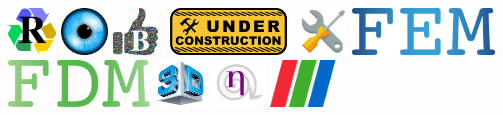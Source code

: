 \noindent
\includegraphics[height=1.25cm]{images/pictograms/replication}
\includegraphics[height=1.25cm]{images/pictograms/visualisation}
\includegraphics[height=1.25cm]{images/pictograms/benchmark}
\includegraphics[height=1.25cm]{images/pictograms/under_construction}
\includegraphics[height=1.25cm]{images/pictograms/tools}
\includegraphics[height=1.25cm]{images/pictograms/FEM}
\includegraphics[height=1.25cm]{images/pictograms/FDM}
\includegraphics[height=1.25cm]{images/pictograms/3d}
\includegraphics[height=1.25cm]{images/pictograms/nonlinear}
\includegraphics[height=1.25cm]{images/pictograms/paraview}


